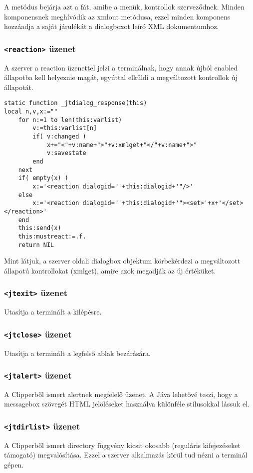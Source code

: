 A metódus bejárja azt a fát, amibe a menük, kontrollok szerveződnek.
Minden komponensnek meghívódik az xmlout metódusa, ezzel minden komponens 
hozzáadja a saját járulékát a dialogboxot leíró XML dokumentumhoz.


 
\subsubsection{{\tt<reaction>} üzenet}

A szerver a reaction üzenettel jelzi a terminálnak,
hogy annak újból enabled állapotba kell helyeznie magát,
egyúttal elküldi a megváltozott kontrollok új állapotát.
 
\begin{verbatim}
static function _jtdialog_response(this)
local n,v,x:=""
    for n:=1 to len(this:varlist)
        v:=this:varlist[n]
        if( v:changed )
            x+="<"+v:name+">"+v:xmlget+"</"+v:name+">" 
            v:savestate
        end
    next
    if( empty(x) )
        x:='<reaction dialogid="'+this:dialogid+'"/>'
    else
        x:='<reaction dialogid="'+this:dialogid+'"><set>'+x+'</set></reaction>'
    end
    this:send(x)
    this:mustreact:=.f.
    return NIL
\end{verbatim}
 
Mint látjuk, a szerver oldali dialogbox objektum körbekérdezi
a megváltozott állapotú kontrollokat (xmlget), amire azok 
megadják az új értéküket.


\subsubsection{{\tt<jtexit>} üzenet}
Utasítja a terminált a kilépésre.
 

\subsubsection{{\tt<jtclose>} üzenet}
Utasítja a terminált a legfelső ablak bezárására.
 

\subsubsection{{\tt<jtalert>} üzenet}
A Clipperből ismert alertnek megfelelő üzenet.
A Jáva lehetővé teszi, hogy a messagebox szövegét HTML
jelöléseket használva különféle stílusokkal lássuk el.

\subsubsection{{\tt<jtdirlist>} üzenet}
A Clipperből ismert directory függvény kicsit okosabb
(reguláris kifejezéseket támogató) megvalósítása.  
Ezzel a szerver alkalmazás körül tud nézni a terminál gépen.


